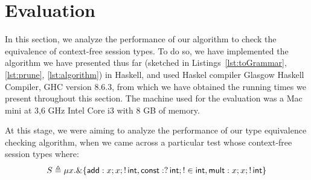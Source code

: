 \section{Evaluation}
\label{sec:evaluation}

In this section, we analyze the performance of our algorithm
to check the equivalence of context-free session types. 
To do so, we have implemented the algorithm we have presented
thus far (sketched in Listings~\ref{lst:toGrammar}, 
\ref{lst:prune}, \ref{lst:algorithm}) 
in Haskell, and used Haskel compiler 
Glasgow Haskell Compiler, GHC version 8.6.3, from which we have 
obtained the running times we present throughout this section.
The machine used for the evaluation was a Mac mini at 3,6 GHz Intel 
Core i3 with 8 GB of memory. 

At this stage, we were aiming to analyze the performance of
our type equivalence checking algorithm, when we came across 
a particular test whose context-free session types where:
\begin{align}
	S \triangleq \mu x . \&\{ \mathsf{add}: x;x; !\,\intk,
							  \mathsf{const}: ?\,\intk;!\in\intk,
							  \mathsf{mult}: x;x;!\,\intk\}

\end{align}